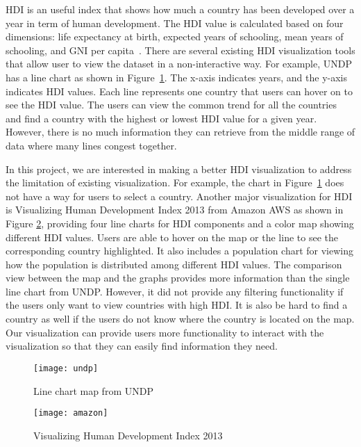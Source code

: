 

\maketitle
HDI is an useful index that shows how much a country has been developed over a year in term of human development. The HDI value is calculated based on four dimensions: life expectancy at birth, expected years of schooling, mean years of schooling, and GNI per capita~\cite{HDIinfo}.
There are several existing HDI visualization tools that allow user to view the dataset in a non-interactive way. For example, UNDP has a line chart as shown in Figure~\ref{fig:undp}. The x-axis indicates years, and the y-axis indicates HDI values. Each line represents one country that users can hover on to see the HDI value. The users can view the common trend for all the countries and find a country with the highest or lowest HDI value for a given year. However, there is no much information they can retrieve from the middle range of data where many lines congest together.

In this project, we are interested in making a better HDI visualization to address the limitation of existing visualization. For example, the chart in Figure~\ref{fig:undp} does not have a way for users to select a country. Another major visualization for HDI is Visualizing Human Development Index 2013 from Amazon AWS as shown in Figure \ref{fig:amazon}, providing four line charts for HDI components and a color map showing different HDI values. Users are able to hover on the map or the line to see the corresponding country highlighted. It also includes a population chart for viewing how the population is distributed among different HDI values.  The comparison view between the map and the graphs provides more information than the single line chart from UNDP. However, it did not provide any filtering functionality if the users only want to view countries with high HDI. It is also be hard to find a country as well if the users do not know where the country is located on the map. Our visualization can provide users more functionality to interact with the visualization so that they can easily find information they need.
\begin{figure}[t]
    \centering
    \texttt{[image: undp]}
    \caption{Line chart map from UNDP~\cite{UNDPlinechart}}
    \label{fig:undp}
\end{figure}
\begin{figure}[t]
    \centering
    \texttt{[image: amazon]}
    \caption{Visualizing Human Development Index 2013~\cite{AmazonHDI}}
    \label{fig:amazon}
\end{figure}
